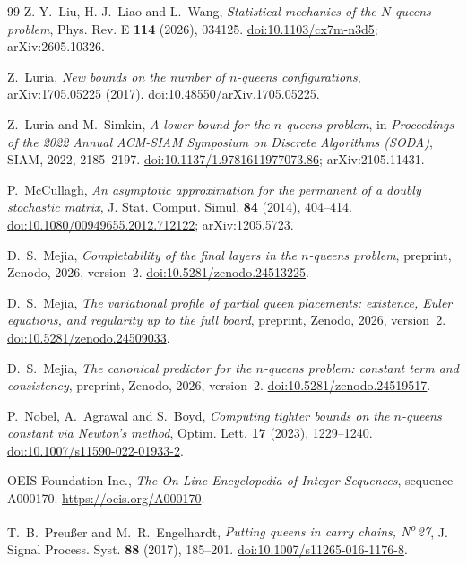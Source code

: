 \begin{thebibliography}{99}
 Z.-Y.~Liu, H.-J.~Liao and L.~Wang, \emph{Statistical mechanics of the $N$-queens problem},
Phys. Rev. E \textbf{114} (2026), 034125.
\href{https://doi.org/10.1103/cx7m-n3d5}{doi:10.1103/cx7m-n3d5}; arXiv:2605.10326.

 Z.~Luria, \emph{New bounds on the number of $n$-queens configurations},
arXiv:1705.05225 (2017).
\href{https://doi.org/10.48550/arXiv.1705.05225}{doi:10.48550/arXiv.1705.05225}.

 Z.~Luria and M.~Simkin, \emph{A lower bound for the $n$-queens problem}, in
\emph{Proceedings of the 2022 Annual ACM-SIAM Symposium on Discrete Algorithms (SODA)}, SIAM, 2022,
2185--2197.
\href{https://doi.org/10.1137/1.9781611977073.86}{doi:10.1137/1.9781611977073.86};
arXiv:2105.11431.

 P.~McCullagh, \emph{An asymptotic approximation for the permanent of a doubly
stochastic matrix}, J. Stat. Comput. Simul. \textbf{84} (2014), 404--414.
\href{https://doi.org/10.1080/00949655.2012.712122}{doi:10.1080/00949655.2012.712122};
arXiv:1205.5723.

 D.~S.~Mejia, \emph{Completability of the final layers in the $n$-queens problem},
preprint, Zenodo, 2026, version~2.
\href{https://doi.org/10.5281/zenodo.24513225}{doi:10.5281/zenodo.24513225}.

 D.~S.~Mejia, \emph{The variational profile of partial queen placements: existence,
Euler equations, and regularity up to the full board}, preprint, Zenodo, 2026, version~2.
\href{https://doi.org/10.5281/zenodo.24509033}{doi:10.5281/zenodo.24509033}.

 D.~S.~Mejia, \emph{The canonical predictor for the $n$-queens problem: constant term
and consistency}, preprint, Zenodo, 2026, version~2.
\href{https://doi.org/10.5281/zenodo.24519517}{doi:10.5281/zenodo.24519517}.

 P.~Nobel, A.~Agrawal and S.~Boyd, \emph{Computing tighter bounds on the $n$-queens
constant via Newton's method}, Optim. Lett. \textbf{17} (2023), 1229--1240.
\href{https://doi.org/10.1007/s11590-022-01933-2}{doi:10.1007/s11590-022-01933-2}.

 OEIS Foundation Inc., \emph{The On-Line Encyclopedia of Integer Sequences},
sequence A000170. \url{https://oeis.org/A000170}.

 T.~B.~Preußer and M.~R.~Engelhardt, \emph{Putting queens in carry chains,
N\textsuperscript{o}\,27}, J. Signal Process. Syst. \textbf{88} (2017), 185--201.
\href{https://doi.org/10.1007/s11265-016-1176-8}{doi:10.1007/s11265-016-1176-8}.


\end{thebibliography}
